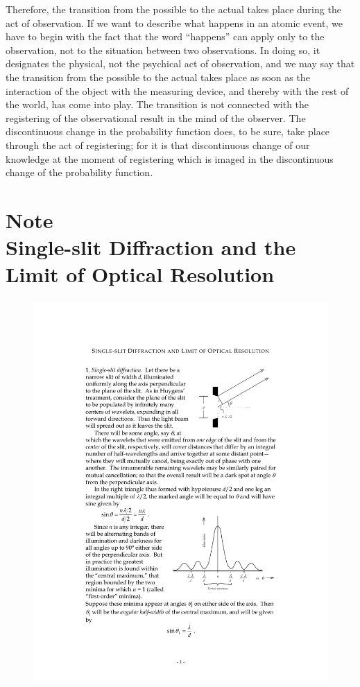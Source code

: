 Therefore, the transition from the possible to the actual takes place
during the act of observation. If we want to describe what happens in an
atomic event, we have to begin with the fact that the word ``happens''
can apply only to the observation, not to the situation between two
observations. In doing so, it designates the physical, not the psychical
act of observation, and we may say that the transition from the possible
to the actual takes place as soon as the interaction of the object with
the measuring device, and thereby with the rest of the world, has come
into play. The transition is not connected with the registering of the
observational result in the mind of the observer. The discontinuous
change in the probability function does, to be sure, take place through
the act of registering; for it is that discontinuous change of our
knowledge at the moment of registering which is imaged in the
discontinuous change of the probability function.

\section*{Note\\
  {\large Single-slit Diffraction and the Limit of Optical Resolution}}
\begin{figure}
\includegraphics{images/10_heisenberg/Figure1SSD.pdf}
\end{figure}

